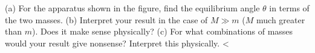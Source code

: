(a) For the apparatus shown in the figure, find the equilibrium angle $\theta$
        in terms of the two masses.\answercheck\hwendpart
        (b) Interpret your result in the case of $M\gg m$ ($M$ much greater than $m$). Does
        it make sense physically?\hwendpart
        (c) For what combinations of masses would your result give nonsense? Interpret
        this physically.
        <%
